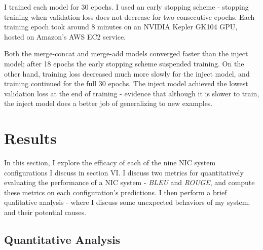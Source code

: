 \documentclass[letterpaper, 10 pt, conference]{ieeeconf}
\begin{document}
I trained each model for 30 epochs. I used an early stopping scheme - stopping training when validation loss does not decrease for two consecutive epochs. Each training epoch took around 8 minutes on an NVIDIA Kepler GK104 GPU, hosted on Amazon's AWS EC2 service. 

Both the merge-concat and merge-add models converged faster than the inject model; after 18 epochs the early stopping scheme suspended training. On the other hand, training loss decreased much more slowly for the inject model, and training continued for the full 30 epochs. The inject model achieved the lowest validation loss at the end of training - evidence that although it is slower to train, the inject model does a better job of generalizing to new examples.


\section{Results}

In this section, I explore the efficacy of each of the nine NIC system configurations I discuss in section VI. I discuss two metrics for quantitatively evaluating the performance of a NIC system - \textit{BLEU} and \textit{ROUGE}, and compute these metrics on each configuration's predictions. I then perform a brief qualitative analysis - where I discuss some unexpected behaviors of my system, and their potential causes.

\subsection{Quantitative Analysis}
\end{document}
